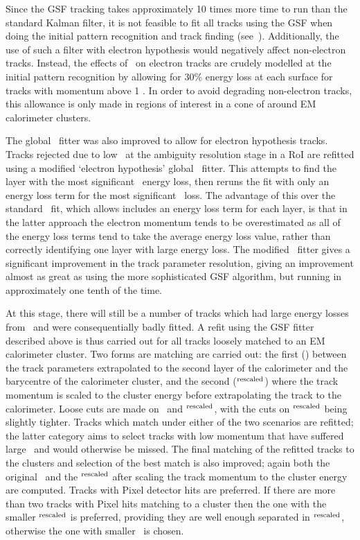 Since the GSF tracking takes approximately 10 times more time to
run than the standard Kalman filter, it is not feasible to fit all tracks using
the GSF when doing the initial pattern recognition and track finding (see~). 
Additionally, the use of such a filter with electron hypothesis would
negatively affect non-electron tracks. Instead, the effects of \brem\ on
electron tracks are crudely modelled at the initial pattern recognition by allowing for 30\% energy loss at each surface for tracks with
momentum above 1 \gev. In order to avoid degrading non-electron tracks, this allowance is only made in regions of interest in a
cone of  around EM calorimeter clusters. 

The global \chisquared\
fitter was also improved to allow for electron hypothesis tracks. Tracks
rejected due to low \chisquared\ at the ambiguity resolution stage in a RoI are
refitted using a modified `electron hypothesis' global \chisquared\ fitter. This
attempts to find the layer with the most significant \brem\ energy loss, then
reruns the fit with only an energy loss term for the most significant \brem\
loss. The advantage of this over the standard \chisquared\ fit, which allows
includes an energy loss term for each layer, is that in the latter approach the
electron momentum tends to be overestimated as all of the energy loss terms tend
to take the average energy loss value, rather than correctly identifying one layer with large
energy loss. The modified \chisquared\ fitter gives a significant improvement in the track
parameter resolution, giving an improvement almost as great as using the more
sophisticated GSF algorithm, but running in approximately one tenth of the time.

At this stage, there will still be a number of tracks which had large energy
losses from \brem\ and were consequentially badly fitted. A refit using the GSF
fitter described above is thus carried out for all tracks loosely matched to an
EM calorimeter cluster. Two forms are matching are carried out: the first
(\deltaR) between the
track parameters extrapolated to the second layer of the calorimeter and the
barycentre of the calorimeter cluster, and the second (\deltaR$^{\rm{rescaled}}$) where the track momentum is
scaled to the cluster energy before extrapolating the track to the calorimeter.
Loose cuts are made on \deltaR\ and \deltaR$^{\rm{rescaled}}$, with the cuts on
\deltaR$^{\rm{rescaled}}$ being slightly tighter.
Tracks which match under either of the two scenarios are refitted; the latter
category aims to select tracks with low momentum that have suffered large
\brem\ and would otherwise be missed. The final matching of the refitted tracks
to the clusters and selection of the best match is also improved; again both the
original \deltaR\ and the \deltaR$^{\rm{rescaled}}$ after scaling the track
momentum to the cluster
energy are computed. Tracks with Pixel detector hits are preferred. If there are
more than two tracks with Pixel hits matching to a cluster then the one with the smaller
\deltaR$^{\rm{rescaled}}$ is preferred, providing they are well enough
separated in \deltaR$^{\rm{rescaled}}$, otherwise the one with smaller \deltaR\
is chosen.

